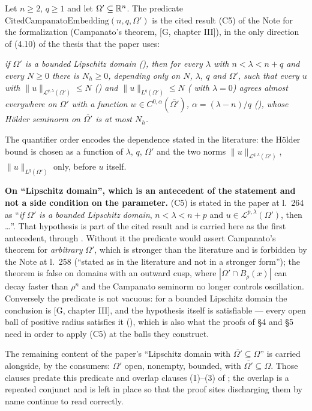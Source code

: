 \begin{definition}
Let $n\ge2$, $q\ge1$ and let $\Omega'\subseteq\mathbb{R}^n$.  The predicate
$\mathrm{CitedCampanatoEmbedding}(n,q,\Omega')$ is the
cited result (C5) of the Note for the formalization (Campanato's theorem,
[G, chapter III]), in the only direction of (4.10) of the thesis that the paper uses:

\emph{if $\Omega'$ is a bounded Lipschitz domain
(), then for every $\lambda$ with $n<\lambda<n+q$ and every $N\ge0$ there is
$N_h\ge0$, depending only on $N$, $\lambda$, $q$ and $\Omega'$, such that every
$u$ with $\|u\|_{\mathcal L^{q,\lambda}(\Omega')}\le N$
() and $\|u\|_{L^q(\Omega')}\le N$
( with $\lambda=0$) agrees almost everywhere on $\Omega'$
with a function $w\in C^{0,\alpha}(\overline{\Omega'})$,
$\alpha=(\lambda-n)/q$ (), whose H\"older seminorm on
$\overline{\Omega'}$ is at most $N_h$.}

The quantifier order encodes the dependence stated in the literature: the
H\"older bound is chosen as a function of $\lambda$, $q$, $\Omega'$ and the two
norms $\|u\|_{\mathcal L^{q,\lambda}(\Omega')}$, $\|u\|_{L^q(\Omega')}$ only,
before $u$ itself.

\textbf{On ``Lipschitz domain'', which is an antecedent of the statement and
not a side condition on the parameter.}  (C5) is stated in the paper at l.~264
as ``\emph{if} $\Omega'$ \emph{is a bounded Lipschitz domain}, $n<\lambda<n+p$
and $u\in\mathcal L^{p,\lambda}(\Omega')$, then \ldots''.  That hypothesis is
part of the cited result and is carried here as the first antecedent, through
.  Without it the predicate would assert
Campanato's theorem for \emph{arbitrary} $\Omega'$, which is stronger than the
literature and is forbidden by the Note at l.~258 (``stated as in the literature
and not in a stronger form''); the theorem is false on domains with an outward
cusp, where $|\Omega'\cap B_\rho(x)|$ can decay faster than $\rho^n$ and the
Campanato seminorm no longer controls oscillation.  Conversely the predicate is
not vacuous: for a bounded Lipschitz domain the conclusion is
[G, chapter III], and the hypothesis itself is satisfiable --- every open ball of
positive radius satisfies it (), which is also
what the proofs of \S4 and \S5 need in order to apply (C5) at the balls they
construct.

The remaining content of the paper's ``Lipschitz domain with
$\overline{\Omega'}\subseteq\Omega$'' is carried alongside, by the consumers:
$\Omega'$ open, nonempty, bounded, with $\overline{\Omega'}\subseteq\Omega$.
Those clauses predate this predicate and overlap clauses (1)--(3) of
; the overlap is a repeated conjunct and is
left in place so that the proof sites discharging them by name continue to
read correctly.
\end{definition}

